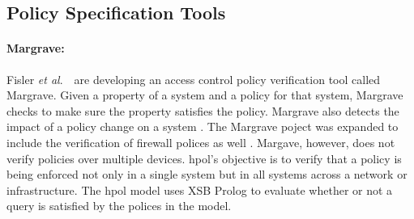 \documentclass[12pt,letterpaper]{report}
\newcommand{\etal}{\textit{et al}.\ }
\begin{document}

\subsection{Policy Specification Tools}

\paragraph{Margrave:}Fisler \etal\ are developing an access control policy verification tool called Margrave. Given a property of a system and a policy for that system, Margrave checks to make sure the property satisfies the policy. Margrave also detects the impact of a policy change on a system \cite{fisler2005verification}. The Margrave poject was expanded to include the verification of firewall polices as well \cite{nelson2010margrave}. Margave, however, does not verify policies over multiple devices. \ac{hpol}'s objective is to verify that a policy is being enforced not only in a single system but in all systems across a network or infrastructure. The \ac{hpol} model uses XSB Prolog to evaluate whether or not a query is satisfied by the polices in the model.


\end{document}
